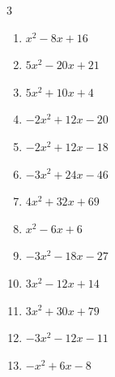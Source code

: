 \begin{multicols}{3}
\begin{enumerate}

  \item $x^{2}-8x+16$


  \item $5x^{2}-20x+21$


  \item $5x^{2}+10x+4$


  \item $-2x^{2}+12x-20$


  \item $-2x^{2}+12x-18$


  \item $-3x^{2}+24x-46$


  \item $4x^{2}+32x+69$


  \item $x^{2}-6x+6$


  \item $-3x^{2}-18x-27$


\columnbreak %

  \item $3x^{2}-12x+14$


  \item $3x^{2}+30x+79$


  \item $-3x^{2}-12x-11$


  \item $-x^{2}+6x-8$



\end{enumerate}
\end{multicols}
